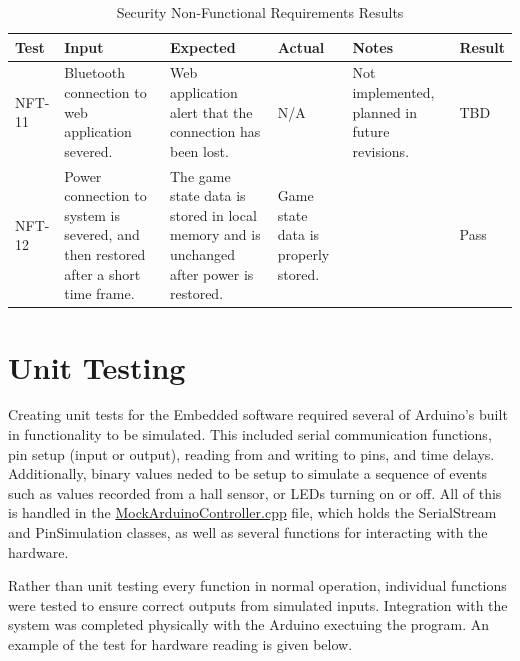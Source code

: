 \documentclass[12pt, titlepage]{article}
\begin{document}
\begin{table}[H]
\centering
    \setlength{\leftmargini}{0.4cm}
    \begin{tabular}{| >{\centering\arraybackslash}m{1cm} | 
        >{\centering\arraybackslash}m{2.5cm} | 
        >{\centering\arraybackslash}m{4cm} | 
        >{\centering\arraybackslash}m{3cm} |
        >{\centering\arraybackslash}m{3cm} |
        >{\centering\arraybackslash}m{1.5cm} |}
    \hline
    \rowcolor[gray]{0.9}
    Test & Input & Expected & Actual & Notes & Result\\
    \hline
    NFT-11 & Bluetooth connection to web application severed. & Web application alert that the connection has been lost. & N/A & Not implemented, planned in future revisions. & TBD \\
    \hline
    NFT-12 & Power connection to system is severed, and then restored after a short time frame. & The game state data is stored in local memory and is unchanged after power is restored. & Game state data is properly stored. &  & Pass \\
    \hline
    \end{tabular}
\caption{Security Non-Functional Requirements Results}
\end{table}

\section{Unit Testing}

  Creating unit tests for the Embedded software required several of Arduino's built in functionality to be simulated. This included serial communication functions,
  pin setup (input or output), reading from and writing to pins, and time delays. Additionally, binary values neded to be setup to simulate a sequence of events 
  such as values recorded from a hall sensor, or LEDs turning on or off. All of this is handled in the 
  \href{../../test/EmbeddedTest/ArduinoTest/MockArduinoController.cpp}{MockArduinoController.cpp} file, which holds the SerialStream and PinSimulation classes,
  as well as several functions for interacting with the hardware.

  Rather than unit testing every function in normal operation, individual functions were tested to ensure correct outputs from simulated inputs. Integration 
  with the system was completed physically with the Arduino exectuing the program. An example of the test for hardware reading is given below. 
\end{document}
